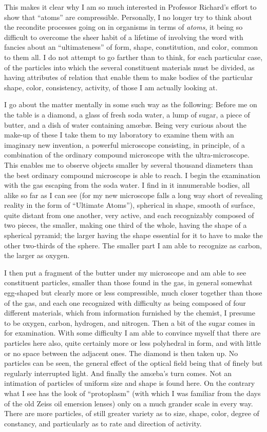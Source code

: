 \documentclass[a4paper, 11pt, oneside, polutonikogreek, english]{article}
\begin{document}
This makes it clear why I am so much interested in Professor Richard's effort to show that ``atoms'' are compressible. Personally, I no longer try to think about the recondite processes going on in organisms in terms of \emph{atoms}, it being so difficult to overcome the sheer habit of a lifetime of involving the word with fancies about an ``ultimateness'' of form, shape, constitution, and color, common to them all. I do not attempt to go farther than to think, for each particular case, of the particles into which the several constituent materials must be divided, as having attributes of relation that enable them to make bodies of the particular shape, color, consistency, activity, of those I am actually looking at.

I go about the matter mentally in some such way as the following: Before me on the table is a diamond, a glass of fresh soda water, a lump of sugar, a piece of butter, and a dish of water containing amœbæ. Being very curious about the make-up of these I take them to my laboratory to examine them with an imaginary new invention, a powerful microscope consisting, in principle, of a combination of the ordinary compound microscope with the ultra-microscope. This enables me to observe objects smaller by several thousand diameters than the best ordinary compound microscope is able to reach. I begin the examination with the gas escaping from the soda water. I find in it innumerable bodies, all alike so far as I can see (for my new microscope falls a long way short of revealing reality in the form of ``Ultimate Atoms''), spherical in shape, smooth of surface, quite distant from one another, very active, and each recognizably composed of two pieces, the smaller, making one third of the whole, having the shape of a spherical pyramid; the larger having the shape essential for it to have to make the other two-thirds of the sphere. The smaller part I am able to recognize as carbon, the larger as oxygen.

I then put a fragment of the butter under my microscope and am able to see constituent particles, smaller than those found in the gas, in general somewhat egg-shaped but clearly more or less compressible, much closer together than those of the gas, and each one recognized with difficulty as being composed of four different materials, which from information furnished by the chemist, I presume to be oxygen, carbon, hydrogen, and nitrogen. Then a bit of the sugar comes in for examination. With some difficulty I am able to convince myself that there are particles here also, quite certainly more or less polyhedral in form, and with little or no space between the adjacent ones. The diamond is then taken up. No particles can be seen, the general effect of the optical field being that of finely but regularly interrupted light. And finally the amœba's turn comes. Not an intimation of particles of uniform size and shape is found here. On the contrary what I see has the look of ``protoplasm'' (with which I was familiar from the days of the old Zeiss oil emersion lenses) only on a much grander scale in every way. There are more particles, of still greater variety as to size, shape, color, degree of constancy, and particularly as to rate and direction of activity.
\end{document}
